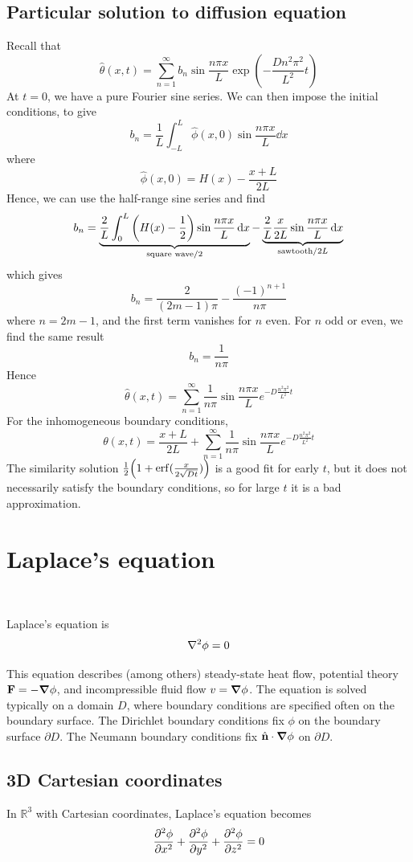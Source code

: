 \documentclass[a4paper]{article}
\begin{document}
\subsection{Particular solution to diffusion equation}
Recall that
\[
	\hat \theta(x,t) = \sum_{n=1}^\infty b_n \sin \frac{n \pi x}{L} \exp(-\frac{Dn^2 \pi^2}{L^2} t )
\]
At \( t = 0 \), we have a pure Fourier sine series.
We can then impose the initial conditions, to give
\[
	b_n = \frac{1}{L} \int_{-L}^L \hat \phi(x,0) \sin \frac{n \pi x}{L} \dd{x}
\]
where
\[
	\hat\phi(x,0) = H(x) - \frac{x+L}{2L}
\]
Hence, we can use the half-range sine series and find
\[
	b_n = \underbrace{ \frac{2}{L} \int_0^L \qty(H(x) - \frac{1}{2}) \sin \frac{n \pi x}{L} \,\mathrm{d}{x} }_{\text{square wave}/2} - \underbrace{ \frac{2}{L}\frac{x}{2L} \sin \frac{n \pi x}{L} \,\mathrm{d}{x} }_{\text{sawtooth}/2L}
\]
which gives
\[
	b_n = \frac{2}{(2m-1)\pi} - \frac{(-1)^{n+1}}{n\pi}
\]
where \( n = 2m - 1 \), and the first term vanishes for \( n \) even.
For \( n \) odd or even, we find the same result
\[
	b_n = \frac{1}{n\pi}
\]
Hence
\[
	\hat\theta(x,t) = \sum_{n=1}^\infty \frac{1}{n \pi} \sin \frac{n \pi x}{L} e^{-D \frac{n^2 \pi^2}{L^2} t}
\]
For the inhomogeneous boundary conditions,
\[
	\theta(x,t) = \frac{x+L}{2L} + \sum_{n=1}^\infty \frac{1}{n \pi} \sin \frac{n \pi x}{L} e^{-D \frac{n^2 \pi^2}{L^2} t}
\]
The similarity solution \( \frac{1}{2}\qty(1 + \erf(\frac{x}{2\sqrt{Dt}})) \) is a good fit for early \( t \), but it does not necessarily satisfy the boundary conditions, so for large \( t \) it is a bad approximation.

\section{Laplace's equation}\ \vspace{-1.5em}

\begin{definition}
    Laplace's equation is
    \[
        \laplacian \phi = 0
    \]
\end{definition}
This equation describes (among others) steady-state heat flow, potential theory \( {\bf F} = -\grad{\phi} \), and incompressible fluid flow \( v = \grad{\phi} \).
The equation is solved typically on a domain \( D \), where boundary conditions are specified often on the boundary surface.
The Dirichlet boundary conditions fix \( \phi \) on the boundary surface \( \partial D \).
The Neumann boundary conditions fix \( \hat {{\bf n}} \cdot \grad{\phi} \) on \( \partial D \).

\subsection{3D Cartesian coordinates}
In \( \mathbb R^3 \) with Cartesian coordinates, Laplace's equation becomes
\[
    \pdv[2]{\phi}{x} + \pdv[2]{\phi}{y} + \pdv[2]{\phi}{z} = 0
\]
\end{document}
